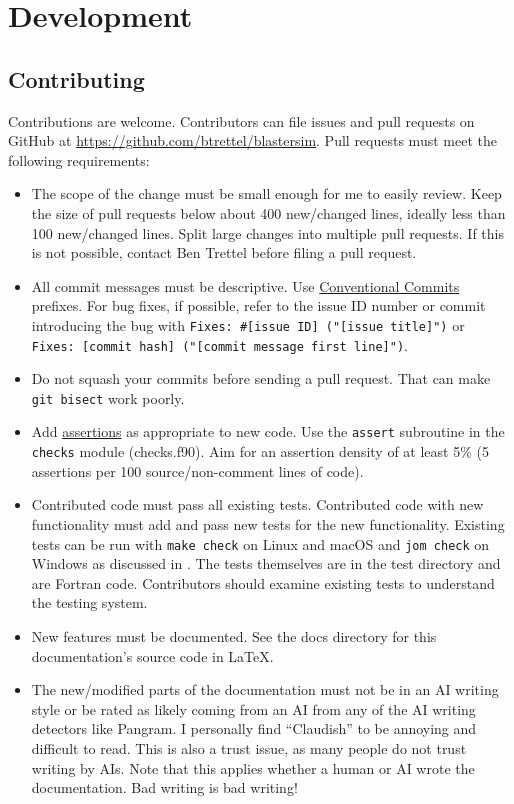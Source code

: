 \chapter{Development}\label{dev}

\section{Contributing}\label{contributing}

Contributions are welcome.
Contributors can file issues and pull requests on GitHub at \url{https://github.com/btrettel/blastersim}.
Pull requests must meet the following requirements:
\begin{itemize}
\item The scope of the change must be small enough for me to easily review.
Keep the size of pull requests below about 400 new/changed lines, ideally less than 100 new/changed lines.
Split large changes into multiple pull requests.
If this is not possible, contact Ben Trettel before filing a pull request.
\item All commit messages must be descriptive.
Use \href{https://www.conventionalcommits.org/en/v1.0.0/}{Conventional Commits} prefixes.
For bug fixes, if possible, refer to the issue ID number or commit introducing the bug with \texttt{Fixes: \#[issue ID] ("[issue title]")} or \texttt{Fixes: [commit hash] ("[commit message first line]")}. %
\item Do not squash your commits before sending a pull request.
That can make \texttt{git bisect} work poorly.
\item Add \href{https://swcarpentry.github.io/python-novice-inflammation/10-defensive.html#assertions}{assertions} as appropriate to new code.
Use the \texttt{assert} subroutine in the \texttt{checks} module (checks.f90).
Aim for an assertion density of at least 5\% (5 assertions per 100 source/non-comment lines of code).
\item Contributed code must pass all existing tests.
Contributed code with new functionality must add and pass new tests for the new functionality.
Existing tests can be run with \texttt{make check} on Linux and macOS and \texttt{jom check} on Windows as discussed in .
The tests themselves are in the test directory and are Fortran code.
Contributors should examine existing tests to understand the testing system.
\item New features must be documented.
See the docs directory for this documentation's source code in LaTeX.
\item The new/modified parts of the documentation must not be in an AI writing style or be rated as likely coming from an AI from any of the AI writing detectors like Pangram.
I personally find ``Claudish'' to be annoying and difficult to read.
This is also a trust issue, as many people do not trust writing by AIs.
Note that this applies whether a human or AI wrote the documentation.
Bad writing is bad writing!
\end{itemize}


